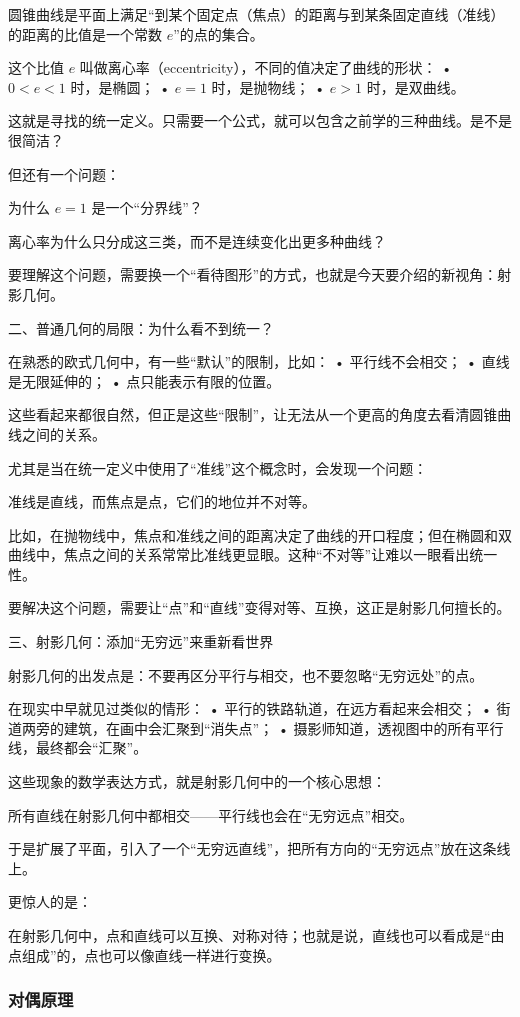 圆锥曲线是平面上满足“到某个固定点（焦点）的距离与到某条固定直线（准线）的距离的比值是一个常数 $e$”的点的集合。

这个比值 $e$ 叫做离心率（eccentricity），不同的值决定了曲线的形状：
	•	$0<e<1$ 时，是椭圆；
	•	$e=1$ 时，是抛物线；
	•	$e>1$ 时，是双曲线。

这就是寻找的统一定义。只需要一个公式，就可以包含之前学的三种曲线。是不是很简洁？

但还有一个问题：

为什么 $e=1$ 是一个“分界线”？

离心率为什么只分成这三类，而不是连续变化出更多种曲线？

要理解这个问题，需要换一个“看待图形”的方式，也就是今天要介绍的新视角：射影几何。


二、普通几何的局限：为什么看不到统一？

在熟悉的欧式几何中，有一些“默认”的限制，比如：
	•	平行线不会相交；
	•	直线是无限延伸的；
	•	点只能表示有限的位置。

这些看起来都很自然，但正是这些“限制”，让无法从一个更高的角度去看清圆锥曲线之间的关系。

尤其是当在统一定义中使用了“准线”这个概念时，会发现一个问题：

准线是直线，而焦点是点，它们的地位并不对等。

比如，在抛物线中，焦点和准线之间的距离决定了曲线的开口程度；但在椭圆和双曲线中，焦点之间的关系常常比准线更显眼。这种“不对等”让难以一眼看出统一性。

要解决这个问题，需要让“点”和“直线”变得对等、互换，这正是射影几何擅长的。

三、射影几何：添加“无穷远”来重新看世界

射影几何的出发点是：不要再区分平行与相交，也不要忽略“无穷远处”的点。

在现实中早就见过类似的情形：
	•	平行的铁路轨道，在远方看起来会相交；
	•	街道两旁的建筑，在画中会汇聚到“消失点”；
	•	摄影师知道，透视图中的所有平行线，最终都会“汇聚”。

这些现象的数学表达方式，就是射影几何中的一个核心思想：

所有直线在射影几何中都相交——平行线也会在“无穷远点”相交。

于是扩展了平面，引入了一个“无穷远直线”，把所有方向的“无穷远点”放在这条线上。

更惊人的是：

在射影几何中，点和直线可以互换、对称对待；也就是说，直线也可以看成是“由点组成”的，点也可以像直线一样进行变换。

\subsubsection{对偶原理}

